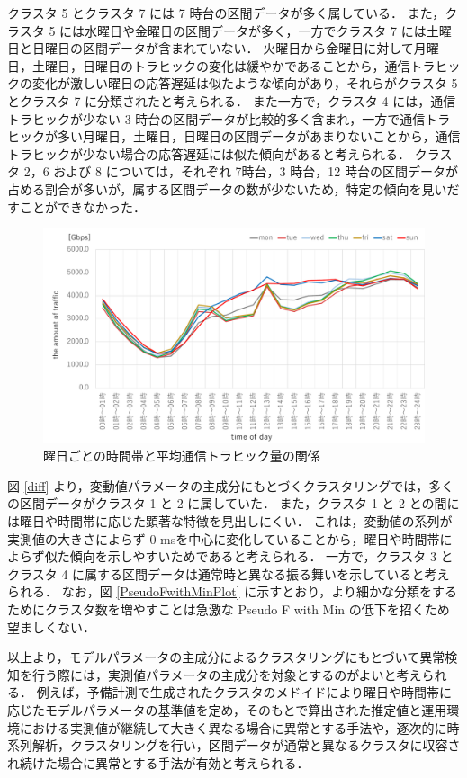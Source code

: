 \documentclass[technicalreport]{ieicej}
\begin{document}
クラスタ 5 とクラスタ 7 には 7 時台の区間データが多く属している．
また，クラスタ 5 には水曜日や金曜日の区間データが多く，一方でクラスタ 7 には土曜日と日曜日の区間データが含まれていない．
火曜日から金曜日に対して月曜日，土曜日，日曜日のトラヒックの変化は緩やかであることから，通信トラヒックの変化が激しい曜日の応答遅延は似たような傾向があり，それらがクラスタ 5 とクラスタ 7 に分類されたと考えられる．
また一方で，クラスタ 4 には，通信トラヒックが少ない 3 時台の区間データが比較的多く含まれ，一方で通信トラヒックが多い月曜日，土曜日，日曜日の区間データがあまりないことから，通信トラヒックが少ない場合の応答遅延には似た傾向があると考えられる．
クラスタ 2，6 および 8 については，それぞれ 7時台，3 時台，12 時台の区間データが占める割合が多いが，属する区間データの数が少ないため，特定の傾向を見いだすことができなかった．

\begin{figure}[tb]
\centering
\includegraphics[width = 0.85\hsize]{traffic.pdf}
\caption{曜日ごとの時間帯と平均通信トラヒック量の関係}
\label{traffic}
\end{figure}

図 \ref{diff} より，変動値パラメータの主成分にもとづくクラスタリングでは，多くの区間データがクラスタ 1 と 2 に属していた．
また，クラスタ 1 と 2 との間には曜日や時間帯に応じた顕著な特徴を見出しにくい．
これは，変動値の系列が実測値の大きさによらず 0 msを中心に変化していることから，曜日や時間帯によらず似た傾向を示しやすいためであると考えられる．
一方で，クラスタ 3 とクラスタ 4 に属する区間データは通常時と異なる振る舞いを示していると考えられる．
なお，図 \ref{PseudoFwithMinPlot} に示すとおり，より細かな分類をするためにクラスタ数を増やすことは急激な Pseudo F with Min の低下を招くため望ましくない．

以上より，モデルパラメータの主成分によるクラスタリングにもとづいて異常検知を行う際には，実測値パラメータの主成分を対象とするのがよいと考えられる．
例えば，予備計測で生成されたクラスタのメドイドにより曜日や時間帯に応じたモデルパラメータの基準値を定め，そのもとで算出された推定値と運用環境における実測値が継続して大きく異なる場合に異常とする手法や，逐次的に時系列解析，クラスタリングを行い，区間データが通常と異なるクラスタに収容され続けた場合に異常とする手法が有効と考えられる．
\end{document}
